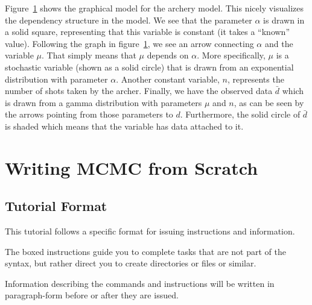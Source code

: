 Figure~\ref{fig:archery_model} shows the graphical model for the archery model.
This nicely visualizes the dependency structure in the model.
We see that the parameter $\alpha$ is drawn in a solid square, representing that this variable is constant (\IE it takes a ``known'' value).
Following the graph in figure~\ref{fig:archery_model}, we see an arrow connecting $\alpha$ and the variable $\mu$.
That simply means that $\mu$ depends on $\alpha$.
More specifically, $\mu$ is a stochastic variable (shown as a solid circle) that is drawn from an exponential distribution with parameter $\alpha$.
Another constant variable, $n$, represents the number of shots taken by the archer.
Finally, we have the observed data $\bar d$ which is drawn from a gamma distribution with parameters $\mu$ and $n$, as can be seen by the arrows pointing from those parameters to $d$.
Furthermore, the solid circle of $\bar d$ is shaded which means that the variable has data attached to it.
\begin{figure}[h!]
\centering
{}
\label{fig:archery_model}
\end{figure}




\section{Writing MCMC from Scratch}\label{sect:MCMC-scratch}

\medskip
\subsection{Tutorial Format}\label{subsect:Exercise-Format}

This tutorial follows a specific format for issuing instructions and information.

{\begin{framed}
The boxed instructions guide you to complete tasks that are not part of the \RevBayes syntax, but rather direct you to create directories or files or similar.
\end{framed}}

Information describing the commands and instructions will be written in paragraph-form before or after they are issued.

